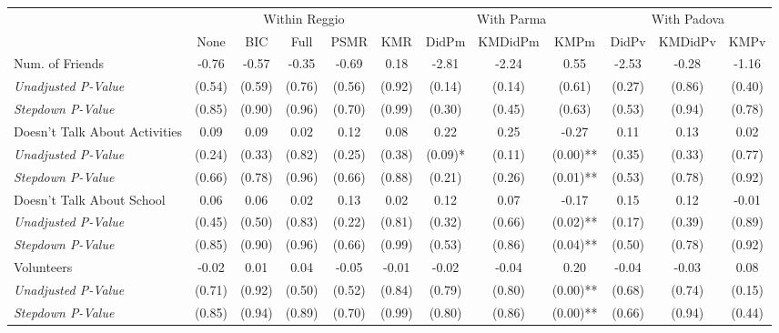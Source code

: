 \begin{tabular}{l c c c c c c c c c c c}
\toprule
& \multicolumn{5}{c}{Within Reggio} & \multicolumn{3}{c}{With Parma} & \multicolumn{3}{c}{With Padova} \\\cmidrule(lr){2-6} \cmidrule(lr){7-9} \cmidrule(lr){10-12}
 & None & BIC & Full & PSMR & KMR & DidPm & KMDidPm & KMPm & DidPv & KMDidPv & KMPv \\
\midrule
Num. of Friends & -0.76 & -0.57 & -0.35 & -0.69 & 0.18 & -2.81 & -2.24 & 0.55 & -2.53 & -0.28 & -1.16 \\
\quad \textit{Unadjusted P-Value} & (0.54) & (0.59) & (0.76) & (0.56) & (0.92) & (0.14) & (0.14) & (0.61) & (0.27) & (0.86) & (0.40) \\
\quad \textit{Stepdown P-Value} & (0.85) & (0.90) & (0.96) & (0.70) & (0.99) & (0.30) & (0.45) & (0.63) & (0.53) & (0.94) & (0.78) \\
Doesn't Talk About Activities & 0.09 & 0.09 & 0.02 & 0.12 & 0.08 & 0.22 & 0.25 & -0.27 & 0.11 & 0.13 & 0.02 \\
\quad \textit{Unadjusted P-Value} & (0.24) & (0.33) & (0.82) & (0.25) & (0.38) & (0.09)* & (0.11) & (0.00)** & (0.35) & (0.33) & (0.77) \\
\quad \textit{Stepdown P-Value} & (0.66) & (0.78) & (0.96) & (0.66) & (0.88) & (0.21) & (0.26) & (0.01)** & (0.53) & (0.78) & (0.92) \\
Doesn't Talk About School & 0.06 & 0.06 & 0.02 & 0.13 & 0.02 & 0.12 & 0.07 & -0.17 & 0.15 & 0.12 & -0.01 \\
\quad \textit{Unadjusted P-Value} & (0.45) & (0.50) & (0.83) & (0.22) & (0.81) & (0.32) & (0.66) & (0.02)** & (0.17) & (0.39) & (0.89) \\
\quad \textit{Stepdown P-Value} & (0.85) & (0.90) & (0.96) & (0.66) & (0.99) & (0.53) & (0.86) & (0.04)** & (0.50) & (0.78) & (0.92) \\
Volunteers & -0.02 & 0.01 & 0.04 & -0.05 & -0.01 & -0.02 & -0.04 & 0.20 & -0.04 & -0.03 & 0.08 \\
\quad \textit{Unadjusted P-Value} & (0.71) & (0.92) & (0.50) & (0.52) & (0.84) & (0.79) & (0.80) & (0.00)** & (0.68) & (0.74) & (0.15) \\
\quad \textit{Stepdown P-Value} & (0.85) & (0.94) & (0.89) & (0.70) & (0.99) & (0.80) & (0.86) & (0.00)** & (0.66) & (0.94) & (0.44) \\
\bottomrule
\end{tabular}
